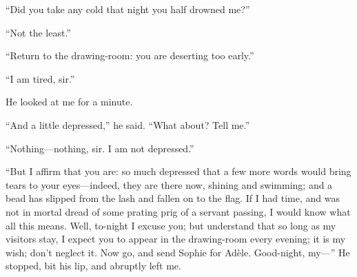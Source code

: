 \enquote{Did you take any cold that night you half drowned me?}

\enquote{Not the least.}

\enquote{Return to the drawing-room: you are deserting too early.}

\enquote{I am tired, sir.}

He looked at me for a minute.

\enquote{And a little depressed,} he said. \enquote{What about? Tell
me.}

\enquote{Nothing---nothing, sir. I am not depressed.}

\enquote{But I affirm that you are: so much depressed that a few more
words would bring tears to your eyes---indeed, they are there now,
shining and swimming; and a bead has slipped from the lash and fallen on
to the flag. If I had time, and was not in mortal dread of some prating
prig of a servant passing, I would know what all this means. Well,
to-night I excuse you; but understand that so long as my visitors stay,
I expect you to appear in the drawing-room every evening; it is my wish;
don't neglect it. Now go, and send Sophie for Adèle. Good-night,
my---} He stopped, bit his lip, and abruptly left me.
